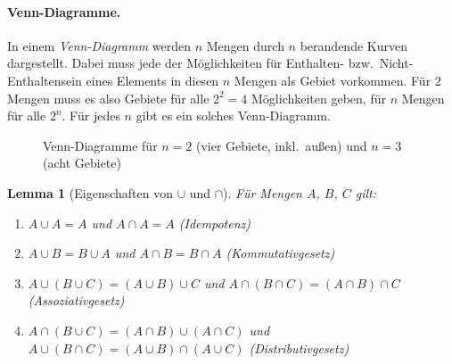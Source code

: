 \documentclass[a4paper]{article}
\theoremstyle{kurzskript}
\newtheorem{lemma}[satz]{Lemma}
\begin{document}
\paragraph{Venn-Diagramme.}
In einem \emph{Venn-Diagramm} werden $n$ Mengen durch $n$ berandende Kurven dargestellt. Dabei muss jede der Möglichkeiten für Enthalten- bzw.\ Nicht-Enthaltensein eines Elements in diesen $n$ Mengen als Gebiet vorkommen. Für $2$ Mengen muss es also Gebiete für alle $2^2 = 4$ Möglichkeiten geben, für $n$ Mengen für alle $2^n$. Für jedes $n$ gibt es ein solches Venn-Diagramm.

\begin{figure}[H]
\centering
{}
\qquad\qquad
{}
\caption{Venn-Diagramme für $n = 2$ (vier Gebiete, inkl.\ außen) und $n = 3$ (acht Gebiete)}
\end{figure}

\begin{lemma}[Eigenschaften von $\cup$ und $\cap$]
Für Mengen $A$, $B$, $C$ gilt:
\begin{enumerate}[label=(\arabic*)]
  \item $A \cup A = A$ und $A \cap A = A$ \hfill (Idempotenz)
  \item $A \cup B = B \cup A$ und $A \cap B = B \cap A$ \hfill (Kommutativgesetz)
  \item $A \cup (B \cup C) = (A \cup B) \cup C$ und $A \cap (B \cap C) = (A \cap B) \cap C$ \hfill (Assoziativgesetz)
  \item $A \cap (B \cup C) = (A \cap B) \cup (A \cap C)$ und $A \cup (B \cap C) = (A \cup B) \cap (A \cup C)$ \hfill (Distributivgesetz)
\end{enumerate}
\end{lemma}
\end{document}
